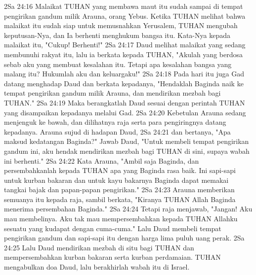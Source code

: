 2Sa 24:16  Malaikat TUHAN yang membawa maut itu sudah sampai di tempat pengirikan gandum milik Arauna, orang Yebus. Ketika TUHAN melihat bahwa malaikat itu sudah siap untuk memusnahkan Yerusalem, TUHAN mengubah keputusan-Nya, dan Ia berhenti menghukum bangsa itu. Kata-Nya kepada malaikat itu, "Cukup! Berhenti!"
2Sa 24:17  Daud melihat malaikat yang sedang membunuhi rakyat itu, lalu ia berkata kepada TUHAN, "Akulah yang berdosa sebab aku yang membuat kesalahan itu. Tetapi apa kesalahan bangsa yang malang itu? Hukumlah aku dan keluargaku!"
2Sa 24:18  Pada hari itu juga Gad datang menghadap Daud dan berkata kepadanya, "Hendaklah Baginda naik ke tempat pengirikan gandum milik Arauna, dan mendirikan mezbah bagi TUHAN."
2Sa 24:19  Maka berangkatlah Daud sesuai dengan perintah TUHAN yang disampaikan kepadanya melalui Gad.
2Sa 24:20  Kebetulan Arauna sedang menjenguk ke bawah, dan dilihatnya raja serta para pengiringnya datang kepadanya. Arauna sujud di hadapan Daud,
2Sa 24:21  dan bertanya, "Apa maksud kedatangan Baginda?" Jawab Daud, "Untuk membeli tempat pengirikan gandum ini, aku hendak mendirikan mezbah bagi TUHAN di sini, supaya wabah ini berhenti."
2Sa 24:22  Kata Arauna, "Ambil saja Baginda, dan persembahkanlah kepada TUHAN apa yang Baginda rasa baik. Ini sapi-sapi untuk kurban bakaran dan untuk kayu bakarnya Baginda dapat memakai tangkai bajak dan papan-papan pengirikan."
2Sa 24:23  Arauna memberikan semuanya itu kepada raja, sambil berkata, "Kiranya TUHAN Allah Baginda menerima persembahan Baginda."
2Sa 24:24  Tetapi raja menjawab, "Jangan! Aku mau membelinya. Aku tak mau mempersembahkan kepada TUHAN Allahku sesuatu yang kudapat dengan cuma-cuma." Lalu Daud membeli tempat pengirikan gandum dan sapi-sapi itu dengan harga lima puluh uang perak.
2Sa 24:25  Lalu Daud mendirikan mezbah di situ bagi TUHAN dan mempersembahkan kurban bakaran serta kurban perdamaian. TUHAN mengabulkan doa Daud, lalu berakhirlah wabah itu di Israel.


